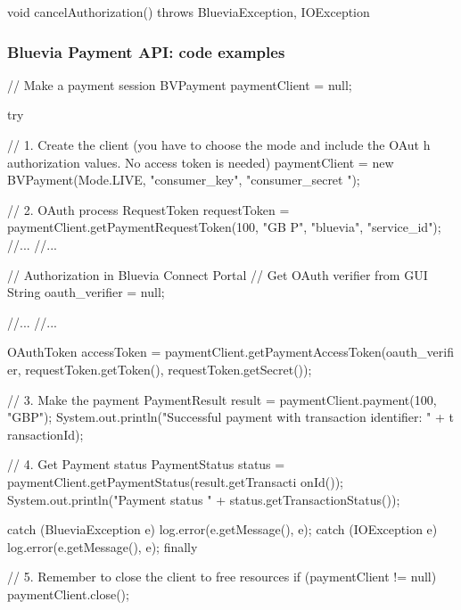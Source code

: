 \begin{DoxyCode}
void cancelAuthorization() throws BlueviaException, IOException
\end{DoxyCode}
\hypertarget{blv_payment_guide_paymentclient_processes_code_example}{}\subsubsection{Bluevia Payment API: code examples}\label{blv_payment_guide_paymentclient_processes_code_example}

\begin{DoxyCode}
// Make a payment session
BVPayment paymentClient = null;

try {

        // 1. Create the client (you have to choose the mode and include the OAut
      h authorization values. No access token is needed)
        paymentClient = new BVPayment(Mode.LIVE, "consumer_key", "consumer_secret
      ");

        // 2. OAuth process
        RequestToken requestToken = paymentClient.getPaymentRequestToken(100, "GB
      P", "bluevia", "service_id");
        //...
        //...

        // Authorization in Bluevia Connect Portal
        // Get OAuth verifier from GUI
        String oauth_verifier = null;

        //...
        //...

        OAuthToken accessToken = paymentClient.getPaymentAccessToken(oauth_verifi
      er, requestToken.getToken(), requestToken.getSecret());

        // 3. Make the payment
        PaymentResult result = paymentClient.payment(100, "GBP");
        System.out.println("Successful payment with transaction identifier: " + t
      ransactionId);


        // 4. Get Payment status
        PaymentStatus status = paymentClient.getPaymentStatus(result.getTransacti
      onId());
        System.out.println("Payment status " + status.getTransactionStatus());          
                
} catch (BlueviaException e) {
        log.error(e.getMessage(), e);
} catch (IOException e) {
        log.error(e.getMessage(), e);
} finally {

        // 5. Remember to close the client to free resources
        if (paymentClient != null)
                paymentClient.close();
} 
\end{DoxyCode}
 